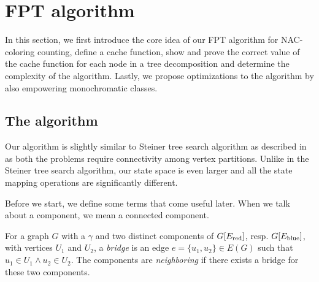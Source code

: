 \section{FPT algorithm}

In this section, we first introduce the core idea of
our FPT algorithm for NAC-coloring counting,
define a cache function,
show and prove the correct value of the cache function for each node in a tree decomposition
and determine the complexity of the algorithm.
Lastly, we propose optimizations to the algorithm by also empowering monochromatic classes.


\subsection{The algorithm}

Our algorithm is slightly similar to Steiner tree search algorithm
as described in~\cite{book_parametrized_algorithms} as both the problems require connectivity
among vertex partitions. Unlike in the Steiner tree search algorithm,
our state space is even larger and all the state mapping operations are significantly different.

Before we start, we define some terms that come useful later.
When we talk about a component, we mean a connected component.
%
\begin{definition}
	For a graph \( G \) with a \rbcol{} \( \gamma \)
	and two distinct components of \( G[E_\text{red}] \), resp. \( G[E_\text{blue}] \),
	with vertices \( U_1 \) and \( U_2 \),
	a \emph{bridge} is an edge \( e = \{u_1, u_2\} \in E(G) \)
	such that \( u_1 \in U_1 \land u_2 \in U_2 \).
	The components are \emph{neighboring} if there exists
	a bridge for these two components.
\end{definition}
%

